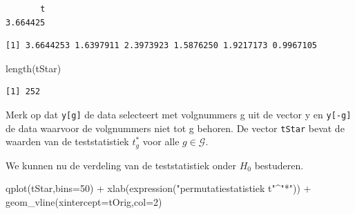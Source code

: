 \documentclass[
  dutch,
  letterpaper,
  12pt]{book}
\newenvironment{Shaded}{\begin{snugshade}}{\end{snugshade}}
\newcommand{\AttributeTok}[1]{\textcolor[rgb]{0.40,0.45,0.13}{#1}}
\newcommand{\ControlFlowTok}[1]{\textcolor[rgb]{0.00,0.23,0.31}{\textbf{#1}}}
\newcommand{\DecValTok}[1]{\textcolor[rgb]{0.68,0.00,0.00}{#1}}
\newcommand{\FunctionTok}[1]{\textcolor[rgb]{0.28,0.35,0.67}{#1}}
\newcommand{\NormalTok}[1]{\textcolor[rgb]{0.00,0.23,0.31}{#1}}
\newcommand{\OtherTok}[1]{\textcolor[rgb]{0.00,0.23,0.31}{#1}}
\newcommand{\SpecialCharTok}[1]{\textcolor[rgb]{0.37,0.37,0.37}{#1}}
\newcommand{\StringTok}[1]{\textcolor[rgb]{0.13,0.47,0.30}{#1}}
\theoremstyle{definition}
\theoremstyle{definition}
\theoremstyle{definition}
\theoremstyle{remark}
\begin{document}
\begin{verbatim}
       t 
3.664425 
\end{verbatim}

\begin{Shaded}
\end{Shaded}

\begin{verbatim}
[1] 3.6644253 1.6397911 2.3973923 1.5876250 1.9217173 0.9967105
\end{verbatim}

\begin{Shaded}
\begin{Highlighting}[]
\FunctionTok{length}\NormalTok{(tStar)}
\end{Highlighting}
\end{Shaded}

\begin{verbatim}
[1] 252
\end{verbatim}

Merk op dat \texttt{y{[}g{]}} de data selecteert met volgnummers g uit
de vector y en \texttt{y{[}-g{]}} de data waarvoor de volgnummers niet
tot g behoren. De vector \texttt{tStar} bevat de waarden van de
teststatistiek \(t^*_g\) voor alle \(g \in {\mathcal{G}}\).

We kunnen nu de verdeling van de teststatistiek onder \(H_0\)
bestuderen.

\begin{Shaded}
\begin{Highlighting}[]
\FunctionTok{qplot}\NormalTok{(tStar,}\AttributeTok{bins=}\DecValTok{50}\NormalTok{) }\SpecialCharTok{+}
  \FunctionTok{xlab}\NormalTok{(}\FunctionTok{expression}\NormalTok{(}\StringTok{"permutatiestatistiek t"}\SpecialCharTok{\^{}}\StringTok{"*"}\NormalTok{)) }\SpecialCharTok{+}
  \FunctionTok{geom\_vline}\NormalTok{(}\AttributeTok{xintercept=}\NormalTok{tOrig,}\AttributeTok{col=}\DecValTok{2}\NormalTok{)}
\end{Highlighting}
\end{Shaded}
\end{document}
